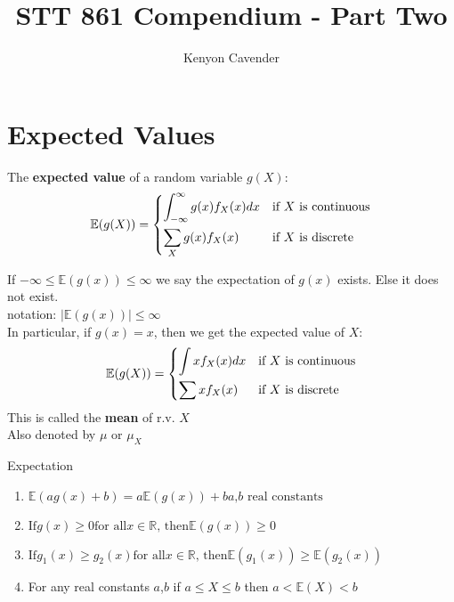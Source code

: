 \documentclass[14pt, oneside, letterpaper, fleqn]{notes}
\begin{document}
\title{STT 861 Compendium - Part Two}
\author{Kenyon Cavender}
\maketitle

\section*{Expected Values}

\begin{mydef}
	The \textbf{expected value} of a random variable $g(X)$: \\
	\[
	\mathbb{E}(g(X)) = 
		\begin{dcases}
			\int_{-\infty}^{\infty} g(x)f_X(x)dx 
			& \text{if $X$ is continuous} \\			
			\sum_{X}g(x)f_X(x)
			& \text{if $X$ is discrete}
		\end{dcases}
	\]
\end{mydef}

\begin{remark}
If $-\infty \leq \mathbb{E}(g(x)) \leq \infty$ we say the
expectation of $g(x)$ exists.  Else it does not exist. \\
\indent notation: $\left| \mathbb{E}(g(x)) \right| 
\leq \infty$ \\
\indent In particular, if $g(x) = x$, then we get the expected
value of $X$: \\
	\[
	\mathbb{E}(g(X)) = 
		\begin{dcases}
			\int xf_X(x)dx 
			& \text{if $X$ is continuous} \\			
			\sum xf_X(x)
			& \text{if $X$ is discrete}
		\end{dcases}
	\]
\indent This is called the \textbf{mean} of r.v. $X$ \\
\indent Also denoted by $\mu$ or $\mu_X$
\end{remark}

\begin{theorem} Expectation 
\begin{enumerate}
	\item $\mathbb{E}(ag(x) + b) = a\mathbb{E}(g(x)) + b
		\text{$a$,$b$ real constants}$
	\item $\text{If} g(x) \geq 0 \text{for all} x \in 
		\mathbb{R} \text{, then} \mathbb{E}(g(x)) \geq 0$
	\item $\text{If} g_1(x) \geq g_2(x) \text{for all} 
		x \in \mathbb{R} \text{, then} 
		\mathbb{E}(g_1(x)) \geq \mathbb{E}(g_2(x))$
	\item For any real constants $a$,$b$ if $a \leq X 
		\leq b$ then $a < \mathbb{E}(X) < b$
\end{enumerate}
\end{theorem}
\end{document}
